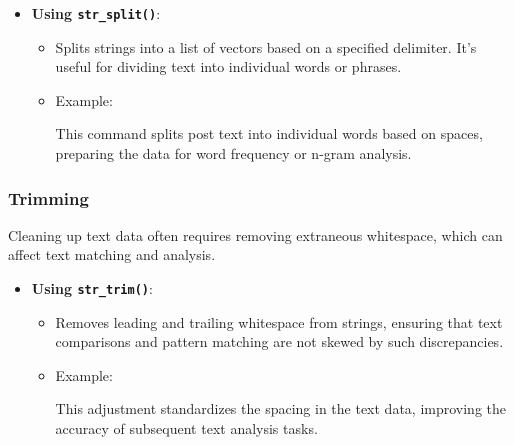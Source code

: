 \documentclass[
]{book}
\newenvironment{Shaded}{\begin{snugshade}}{\end{snugshade}}
\newcommand{\FunctionTok}[1]{\textcolor[rgb]{0.13,0.29,0.53}{\textbf{#1}}}
\newcommand{\NormalTok}[1]{#1}
\newcommand{\OtherTok}[1]{\textcolor[rgb]{0.56,0.35,0.01}{#1}}
\newcommand{\SpecialCharTok}[1]{\textcolor[rgb]{0.81,0.36,0.00}{\textbf{#1}}}
\newcommand{\StringTok}[1]{\textcolor[rgb]{0.31,0.60,0.02}{#1}}
\providecommand{\tightlist}{%
  \setlength{\itemsep}{0pt}\setlength{\parskip}{0pt}}
\begin{document}
\begin{itemize}
\tightlist
\item
  \textbf{Using \texttt{str\_split()}}:

  \begin{itemize}
  \item
    Splits strings into a list of vectors based on a specified delimiter. It's useful for dividing text into individual words or phrases.
  \item
    Example:

\begin{Shaded}
\end{Shaded}

    This command splits post text into individual words based on spaces, preparing the data for word frequency or n-gram analysis.
  \end{itemize}
\end{itemize}

\hypertarget{trimming}{%
\subsubsection{Trimming}\label{trimming}}

Cleaning up text data often requires removing extraneous whitespace, which can affect text matching and analysis.

\begin{itemize}
\tightlist
\item
  \textbf{Using \texttt{str\_trim()}}:

  \begin{itemize}
  \item
    Removes leading and trailing whitespace from strings, ensuring that text comparisons and pattern matching are not skewed by such discrepancies.
  \item
    Example:

\begin{Shaded}
\end{Shaded}

    This adjustment standardizes the spacing in the text data, improving the accuracy of subsequent text analysis tasks.
  \end{itemize}
\end{itemize}
\end{document}
